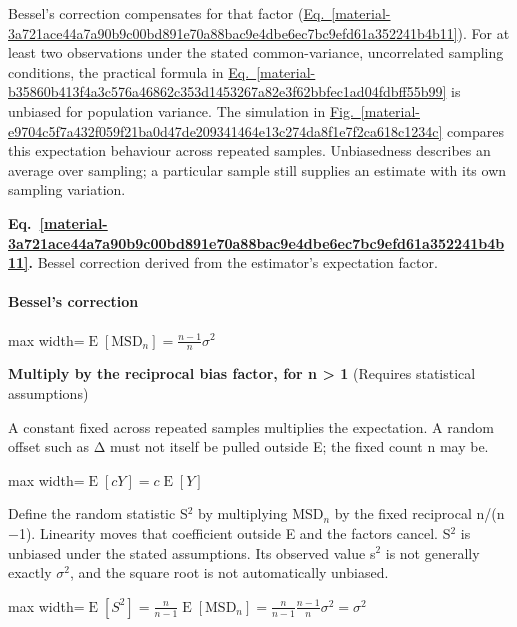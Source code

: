 \documentclass[11pt,a4paper]{article}
\begin{document}
Bessel's correction compensates for that factor (\hyperref[material-3a721ace44a7a90b9c00bd891e70a88bac9e4dbe6ec7bc9efd61a352241b4b11]{Eq.~\ref*{material-3a721ace44a7a90b9c00bd891e70a88bac9e4dbe6ec7bc9efd61a352241b4b11}}). For at least two observations under the stated common-variance, uncorrelated sampling conditions, the practical formula in \hyperref[material-b35860b413f4a3c576a46862c353d1453267a82e3f62bbfec1ad04fdbff55b99]{Eq.~\ref*{material-b35860b413f4a3c576a46862c353d1453267a82e3f62bbfec1ad04fdbff55b99}} is unbiased for population variance. The simulation in \hyperref[material-e9704c5f7a432f059f21ba0d47de209341464e13c274da8f1e7f2ca618c1234c]{Fig.~\ref*{material-e9704c5f7a432f059f21ba0d47de209341464e13c274da8f1e7f2ca618c1234c}} compares this expectation behaviour across repeated samples. Unbiasedness describes an average over sampling; a particular sample still supplies an estimate with its own sampling variation.


\par\medskip
{}
\label{material-3a721ace44a7a90b9c00bd891e70a88bac9e4dbe6ec7bc9efd61a352241b4b11}
\noindent\textbf{Eq.~\ref*{material-3a721ace44a7a90b9c00bd891e70a88bac9e4dbe6ec7bc9efd61a352241b4b11}.} Bessel correction derived from the estimator's expectation factor.\par\nopagebreak
\paragraph{Bessel's correction}
\begin{center}\begin{adjustbox}{max width=\linewidth}$\displaystyle \operatorname{E}[\mathrm{MSD}_n]=\frac{n-1}{n}\sigma^2$\end{adjustbox}\end{center}
\noindent\textbf{Multiply by the reciprocal bias factor, for n > 1} (Requires statistical assumptions)\par
A constant fixed across repeated samples multiplies the expectation. A random offset such as Δ must not itself be pulled outside E; the fixed count n may be.
\begin{center}\begin{adjustbox}{max width=\linewidth}$\displaystyle \operatorname{E}[cY]=c\operatorname{E}[Y]$\end{adjustbox}\end{center}

Define the random statistic S\ensuremath{{}^2} by multiplying MSD\ensuremath{{}_n} by the fixed reciprocal n/(n\ensuremath{-}1). Linearity moves that coefficient outside E and the factors cancel. S\ensuremath{{}^2} is unbiased under the stated assumptions. Its observed value s\ensuremath{{}^2} is not generally exactly \ensuremath{\sigma}\ensuremath{{}^2}, and the square root is not automatically unbiased.
\begin{center}\begin{adjustbox}{max width=\linewidth}$\displaystyle \operatorname{E}[S^2]=\frac{n}{n-1}\operatorname{E}[\mathrm{MSD}_n]=\frac{n}{n-1}\frac{n-1}{n}\sigma^2=\sigma^2$\end{adjustbox}\end{center}
\end{document}
